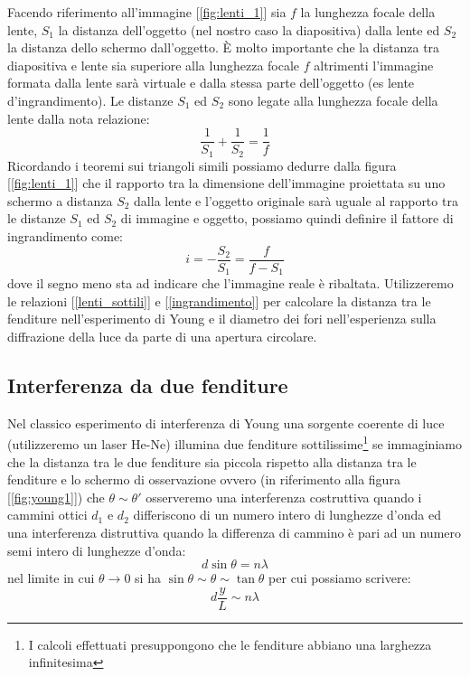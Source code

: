 \documentclass[a4paper,10pt,oneside]{article}
\begin{document}
Facendo riferimento all'immagine [\ref{fig:lenti_1}] sia $f$ la lunghezza focale della lente, $S_1$ la distanza dell'oggetto (nel nostro caso la diapositiva) dalla lente ed $S_2$ la distanza dello schermo dall'oggetto. È molto importante che la distanza tra diapositiva e lente sia superiore alla lunghezza focale $f$ altrimenti l'immagine formata dalla lente sarà virtuale e dalla stessa parte dell'oggetto (es lente d'ingrandimento). Le distanze $S_1$ ed $S_2$ sono legate alla lunghezza focale della lente dalla nota relazione:
\begin{equation}\label{lenti_sottili}
 \frac{1}{S_1}+\frac{1}{S_2}=\frac{1}{f}
\end{equation}
Ricordando i teoremi sui triangoli simili possiamo dedurre dalla figura [\ref{fig:lenti_1}] che il rapporto tra la dimensione dell'immagine proiettata su uno schermo a distanza $S_2$ dalla lente e l'oggetto originale sarà uguale al rapporto tra le distanze $S_1$ ed $S_2$ di immagine e oggetto, possiamo quindi definire il fattore di ingrandimento come:
\begin{equation}\label{ingrandimento}
 i=-\frac{S_2}{S_1}=\frac{f}{f-S_1}
\end{equation}
dove il segno meno sta ad indicare che l'immagine reale è ribaltata. Utilizzeremo le relazioni [\ref{lenti_sottili}] e [\ref{ingrandimento}] per calcolare la distanza tra le fenditure nell'esperimento di Young e il diametro dei fori nell'esperienza sulla diffrazione della luce da parte di una apertura circolare.

\subsection{Interferenza da due fenditure}

Nel classico esperimento di  interferenza di Young una sorgente coerente di luce (utilizzeremo un laser He-Ne) illumina due fenditure sottilissime\footnote{I calcoli  effettuati presuppongono che le fenditure abbiano una larghezza infinitesima} se immaginiamo che la distanza tra le due fenditure sia piccola rispetto alla distanza tra le fenditure e lo schermo di osservazione  ovvero (in riferimento alla figura [\ref{fig:young1}]) che $\theta \sim \theta '$ osserveremo una interferenza costruttiva quando i cammini ottici $d_1$ e $d_2$ differiscono di un numero intero di lunghezze d'onda ed una interferenza distruttiva quando la differenza di cammino è pari ad un numero semi intero di lunghezze d'onda:
\begin{equation}
 d\sin \theta=n\lambda
\end{equation}
nel limite in cui $\theta \to 0$ si ha $\sin \theta \sim \theta \sim \tan \theta$ per cui possiamo scrivere:
\begin{equation}
 d\frac{y}{L}\sim n\lambda
\end{equation}
\end{document}
